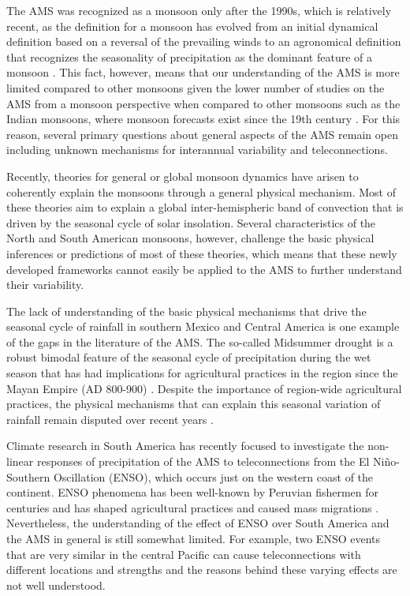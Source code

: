 The AMS was recognized as a monsoon only after the 1990s, which is relatively recent, as the definition for a monsoon has evolved from an initial dynamical definition based on a reversal of the prevailing winds to an agronomical definition that recognizes the seasonality of precipitation as the dominant feature of a monsoon \citep{wang2017,gadgil2018}. This fact, however, means that our understanding of the AMS is more limited compared to other monsoons given the lower number of studies on the AMS from a monsoon perspective when compared to other monsoons such as the Indian monsoons, where monsoon forecasts exist since the 19th century \citep{blanford}.
For this reason, several primary questions about general aspects of the AMS remain open including unknown mechanisms for interannual variability and teleconnections.

Recently, theories for general or global monsoon dynamics \citep{bordoni2008monsoons,biasutti2018global,hill2019,geen2020} have arisen to coherently explain the monsoons through a general physical mechanism. Most of these theories aim to explain a global inter-hemispheric band of convection that is driven by the seasonal cycle of solar insolation. Several characteristics of the North and South American monsoons, however, challenge the basic physical inferences or predictions of most of these theories, which means that these newly developed frameworks cannot  easily be applied to the AMS to further understand their variability. 


The lack of understanding of the basic physical mechanisms that drive the seasonal cycle of rainfall in southern Mexico and Central America is one example of the gaps in the literature of the AMS. The so-called Midsummer drought is a robust bimodal feature of the seasonal cycle of precipitation during the wet season that has had implications for agricultural practices in the region since the Mayan Empire (AD 800-900) \citep{jobbova2018ritual}. Despite the importance of region-wide agricultural practices, the physical mechanisms that can explain this seasonal variation of rainfall remain disputed over recent years \citep{karnauskas2013,herrera2015,zermeno2019}. 

Climate research in South America has recently focused to investigate the non-linear responses of precipitation of the AMS to teleconnections from the El Niño-Southern Oscillation (ENSO), which occurs just on the western coast of the continent. ENSO phenomena has been well-known by Peruvian fishermen for centuries and has shaped agricultural practices and caused mass migrations \citep{caramanica2020nino}. Nevertheless, the understanding of the effect of ENSO over South America and the AMS in general is still somewhat limited. For example, two ENSO events that are very similar in the central Pacific can cause teleconnections with different locations and strengths and the reasons behind these varying effects are not well understood. 

